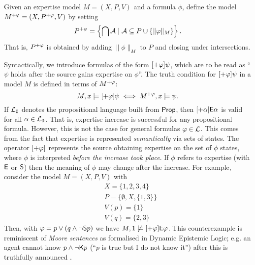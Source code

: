 \begin{definition}
\label{exp_def_expinc_model}
Given an expertise model $M = (X, P, V)$ and a formula $\phi$,
define the model $M^{\expinc\phi} = (X, P^{\expinc\phi}, V)$ by
setting
\[
P^{\expinc\phi}
=
\left\{\bigcap \mathcal{A} \mid \mathcal{A} \subseteq P \cup \{\|\phi\|_M\}\right\}.
\]
That is, $P^{\expinc\phi}$ is obtained by adding
$\|\phi\|_M$ to $P$ and closing under intersections.

\end{definition}

Syntactically, we introduce formulas of the form $[\expinc\phi]\psi$,
which are to be read as ``$\psi$ holds after the source gains expertise on
$\phi$''. The truth condition for $[\expinc\phi]\psi$ in a model
$M$ is defined in terms of $M^{\expinc\phi}$:
\[
M, x \models [\expinc\phi]\psi
\iff
M^{\expinc\phi}, x \models \psi.\]
If $\cLzero$ denotes the propositional language built from $\Prop$,
then $[\expinc\alpha]\E\alpha$ is valid for all $\alpha \in
\cLzero$. That is, expertise increase is successful for any propositional
formula. However, this is not the case for general formulas $\phi \in
\cL$. This comes from the fact that expertise is represented \emph{semantically} via
sets of states. The operator $[\expinc\phi]$ represents the source
obtaining expertise on the set of $\phi$ states, where $\phi$ is
interpreted \emph{before the increase took place}. If $\phi$ refers to
expertise (with $\E$ or $\S$) then the meaning of $\phi$ may
change after the increase. For example, consider the model $M = (X, P,
V)$ with
\[
\begin{aligned}
    &X = \{1, 2, 3, 4\} \\
    &P = \{\emptyset, X, \{1, 3\}\} \\
    &V(p) = \{1\} \\
    &V(q) = \{2, 3\}
\end{aligned}\]
Then, with $\phi = p \lor (q \land \neg\S p)$ we have $M, 1 \not\models
[\expinc\phi]\E\phi$.\footnotemark{} This counterexample is reminiscent of
\emph{Moore sentences} as formalised in Dynamic Epistemic Logic; e.g. an agent
cannot know $p \land \neg\K p$ (``$p$ is true but I do not know it'') after this
is truthfully announced \cite{baltag2008qualitative}.


